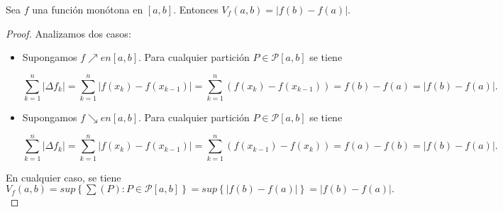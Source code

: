 \begin{lemma}

Sea $f$ una función monótona en $ \left[ a,b \right] $. Entonces $V_f \left( a,b \right) = |f\left(b\right)-f\left(a\right)|$.

\end{lemma}

\begin{proof}

Analizamos dos casos:
\begin{itemize}
  
  \item[\tiny{\ding{110}}] Supongamos $f \nearrow en \left[ a,b \right]$. Para cualquier partición $P \in \mathcal{P} \left[ a,b \right]$ se tiene 
  
  \begin{equation*}
  \sum_{k=1}^{n} |\Delta f_k|= \sum_{k=1}^{n} |f\left(x_k\right)-f\left( x_{k-1}\right)| = \sum_{k=1}^{n} \left(f\left(x_k \right)-f\left(x_{k-1} \right)\right)=f \left(b \right)-f\left(a \right)=|f\left(b \right)-f\left(a \right)|.
  \end{equation*}

  \item[\tiny{\ding{110}}] Supongamos $f \searrow en \left[ a,b \right]$. Para cualquier partición $P \in \mathcal{P} \left[ a,b \right]$ se tiene 

  \begin{equation*}
  \sum_{k=1}^{n} |\Delta f_k|= \sum_{k=1}^{n} |f\left(x_k\right)-f\left( x_{k-1}\right)| = \sum_{k=1}^{n} \left(f\left(x_{k-1} \right)-f\left(x_{k} \right)\right)=f \left(a \right)-f\left(b \right)=|f\left(b \right)-f\left(a \right)|.
  \end{equation*}
  
\end{itemize}

En cualquier caso, se tiene $V_f \left(a,b\right)=sup\left\lbrace\sum \left(P\right):P\in \mathcal{P} \left[a,b\right]\right\rbrace=sup\left\lbrace|f\left(b\right)-f\left(a\right)|\right\rbrace=|f\left(b\right)-f\left(a\right)|.$ 

\end{proof}
